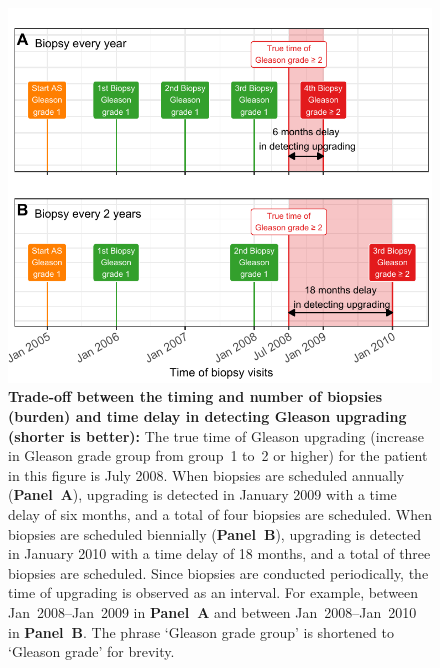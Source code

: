 \begin{figure}
\centerline{\includegraphics{contents/c5/images/c5_fig1.pdf}}
\caption{\textbf{Trade-off between the timing and number of biopsies (burden) and time delay in detecting Gleason upgrading (shorter is better):} The true time of Gleason upgrading (increase in Gleason grade group from group~1 to~2 or higher) for the patient in this figure is July 2008. When biopsies are scheduled annually (\textbf{Panel~A}), upgrading is detected in January 2009 with a time delay of six months, and a total of four biopsies are scheduled. When biopsies are scheduled biennially (\textbf{Panel~B}), upgrading is detected in January 2010 with a time delay of 18 months, and a total of three biopsies are scheduled. Since biopsies are conducted periodically, the time of upgrading is observed as an interval. For example, between Jan~2008--Jan~2009 in \textbf{Panel~A} and between Jan~2008--Jan~2010 in \textbf{Panel~B}. The phrase `Gleason grade group' is shortened to `Gleason grade' for brevity.}
\label{c5:fig:1}
\end{figure}

